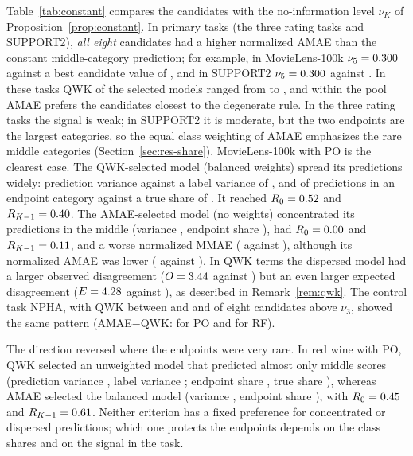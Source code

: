 \documentclass[pdflatex,sn-mathphys-ay]{sn-jnl}
\theoremstyle{thmstyleone}
\theoremstyle{thmstylethree}
\begin{document}
Table~\ref{tab:constant} compares the candidates with the no-information level $\nu_K$ of Proposition~\ref{prop:constant}. In \NConstWorseTasks{} primary tasks (the three rating tasks and SUPPORT2), \emph{all eight} candidates had a higher normalized AMAE than the constant middle-category prediction; for example, in MovieLens-100k $\nu_5=0.300{}$ against a best candidate value of \BestCandNamaeMl{}, and in SUPPORT2 $\nu_5=0.300{}$ against \BestCandNamaeSp{}. In these tasks QWK of the selected models ranged from \QwkRangeLow{} to \QwkRangeHigh{}, and within the pool AMAE prefers the candidates closest to the degenerate rule. In the three rating tasks the signal is weak; in SUPPORT2 it is moderate, but the two endpoints are the largest categories, so the equal class weighting of AMAE emphasizes the rare middle categories (Section~\ref{sec:res-share}). MovieLens-100k with PO is the clearest case. The QWK-selected model (balanced weights) spread its predictions widely: prediction variance \PredVarMlPoQwk{} against a label variance of \LabVarMl{}, and \EndShareMlPoQwk{} of predictions in an endpoint category against a true share of \LabEndMl{}. It reached $R_0=0.52{}$ and $R_{K-1}=0.40{}$. The AMAE-selected model (no weights) concentrated its predictions in the middle (variance \PredVarMlPoAmae{}, endpoint share \EndShareMlPoAmae{}), had $R_0=0.00{}$ and $R_{K-1}=0.11{}$, and a worse normalized MMAE (\NmmaeMlPoAmae{} against \NmmaeMlPoQwk{}), although its normalized AMAE was lower (\NamaeMlPoAmae{} against \NamaeMlPoQwk{}). In QWK terms the dispersed model had a larger observed disagreement ($O=3.44{}$ against \ObsMlPoAmae{}) but an even larger expected disagreement ($E=4.28{}$ against \ExpMlPoAmae{}), as described in Remark~\ref{rem:qwk}. The control task NPHA, with QWK between \NphaQwkLow{} and \NphaQwkHigh{} and \NphaConstWorse{} of eight candidates above $\nu_3$, showed the same pattern (AMAE$-$QWK: \NphaAmaePo{} for PO and \NphaAmaeRf{} for RF).

The direction reversed where the endpoints were very rare. In red wine with PO, QWK selected an unweighted model that predicted almost only middle scores (prediction variance \PredVarWrPoQwk{}, label variance \LabVarWr{}; endpoint share \EndShareWrPoQwk{}, true share \LabEndWr{}), whereas AMAE selected the balanced model (variance \PredVarWrPoAmae{}, endpoint share \EndShareWrPoAmae{}), with $R_0=0.45{}$ and $R_{K-1}=0.61{}$. Neither criterion has a fixed preference for concentrated or dispersed predictions; which one protects the endpoints depends on the class shares and on the signal in the task.
\end{document}
